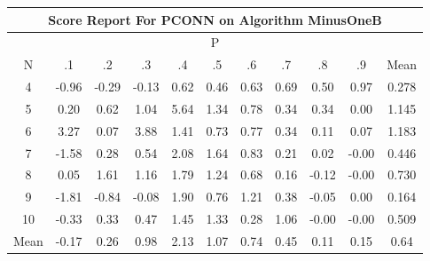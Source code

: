 \documentclass[11pt,a4paper]{report}
\begin{document}
\begin{longtable}{ | c || c | c | c | c | c | c | c | c | c || c |}
\hline
\multicolumn{11}{|c|}{ Score Report For PCONN on Algorithm MinusOneB} \\
\hline
\multicolumn{11}{|c|}{ P } \\
\hline
N & .1 & .2 & .3 & .4 & .5 & .6 & .7 & .8 & .9 & Mean\\
 \hline
 \hline
 \endhead
  4 &  \cellcolor[HTML]{FFE7E7} -0.96 &  \cellcolor[HTML]{FFF7F7} -0.29 &  \cellcolor[HTML]{FFFFFF} -0.13 &  \cellcolor[HTML]{EFEFFF} 0.62 &  \cellcolor[HTML]{F7F7FF} 0.46 &  \cellcolor[HTML]{EFEFFF} 0.63 &  \cellcolor[HTML]{EFEFFF} 0.69 &  \cellcolor[HTML]{EFEFFF} 0.50 &  \cellcolor[HTML]{E7E7FF} 0.97 & 0.278 \\
  5 &  \cellcolor[HTML]{F7F7FF} 0.20 &  \cellcolor[HTML]{EFEFFF} 0.62 &  \cellcolor[HTML]{E7E7FF} 1.04 &  \cellcolor[HTML]{7070FF} 5.64 &  \cellcolor[HTML]{DFDFFF} 1.34 &  \cellcolor[HTML]{EFEFFF} 0.78 &  \cellcolor[HTML]{F7F7FF} 0.34 &  \cellcolor[HTML]{F7F7FF} 0.34 &  \cellcolor[HTML]{FFFFFF} 0.00 & 1.145 \\
  6 &  \cellcolor[HTML]{AFAFFF} 3.27 &  \cellcolor[HTML]{FFFFFF} 0.07 &  \cellcolor[HTML]{9F9FFF} 3.88 &  \cellcolor[HTML]{DFDFFF} 1.41 &  \cellcolor[HTML]{EFEFFF} 0.73 &  \cellcolor[HTML]{EFEFFF} 0.77 &  \cellcolor[HTML]{F7F7FF} 0.34 &  \cellcolor[HTML]{FFFFFF} 0.11 &  \cellcolor[HTML]{FFFFFF} 0.07 & 1.183 \\
  7 &  \cellcolor[HTML]{FFD7D7} -1.58 &  \cellcolor[HTML]{F7F7FF} 0.28 &  \cellcolor[HTML]{EFEFFF} 0.54 &  \cellcolor[HTML]{C7C7FF} 2.08 &  \cellcolor[HTML]{D7D7FF} 1.64 &  \cellcolor[HTML]{E7E7FF} 0.83 &  \cellcolor[HTML]{F7F7FF} 0.21 &  \cellcolor[HTML]{FFFFFF} 0.02 &  \cellcolor[HTML]{FFFFFF} -0.00 & 0.446 \\
  8 &  \cellcolor[HTML]{FFFFFF} 0.05 &  \cellcolor[HTML]{D7D7FF} 1.61 &  \cellcolor[HTML]{DFDFFF} 1.16 &  \cellcolor[HTML]{CFCFFF} 1.79 &  \cellcolor[HTML]{DFDFFF} 1.24 &  \cellcolor[HTML]{EFEFFF} 0.68 &  \cellcolor[HTML]{F7F7FF} 0.16 &  \cellcolor[HTML]{FFFFFF} -0.12 &  \cellcolor[HTML]{FFFFFF} -0.00 & 0.730 \\
  9 &  \cellcolor[HTML]{FFCFCF} -1.81 &  \cellcolor[HTML]{FFE7E7} -0.84 &  \cellcolor[HTML]{FFFFFF} -0.08 &  \cellcolor[HTML]{CFCFFF} 1.90 &  \cellcolor[HTML]{EFEFFF} 0.76 &  \cellcolor[HTML]{DFDFFF} 1.21 &  \cellcolor[HTML]{F7F7FF} 0.38 &  \cellcolor[HTML]{FFFFFF} -0.05 &  \cellcolor[HTML]{FFFFFF} 0.00 & 0.164 \\
  10 &  \cellcolor[HTML]{FFF7F7} -0.33 &  \cellcolor[HTML]{F7F7FF} 0.33 &  \cellcolor[HTML]{F7F7FF} 0.47 &  \cellcolor[HTML]{D7D7FF} 1.45 &  \cellcolor[HTML]{DFDFFF} 1.33 &  \cellcolor[HTML]{F7F7FF} 0.28 &  \cellcolor[HTML]{E7E7FF} 1.06 &  \cellcolor[HTML]{FFFFFF} -0.00 &  \cellcolor[HTML]{FFFFFF} -0.00 & 0.509 \\
 \hline
 \hline
Mean &  \cellcolor[HTML]{FFF7F7} -0.17 &  \cellcolor[HTML]{F7F7FF} 0.26 &  \cellcolor[HTML]{E7E7FF} 0.98 &  \cellcolor[HTML]{C7C7FF} 2.13 &  \cellcolor[HTML]{E7E7FF} 1.07 &  \cellcolor[HTML]{EFEFFF} 0.74 &  \cellcolor[HTML]{F7F7FF} 0.45 &  \cellcolor[HTML]{FFFFFF} 0.11 &  \cellcolor[HTML]{FFFFFF} 0.15 &  \cellcolor[HTML]{EFEFFF} 0.64
\end{longtable}
\end{document}
